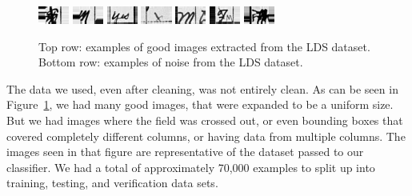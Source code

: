 \begin{figure}[ht]
\begin{center}
    \\[1em]
      \includegraphics[width=0.09\textwidth]{images/Subimages/problematic/004531795_00275-72.png}
      \includegraphics[width=0.09\textwidth]{images/Subimages/problematic/004531795_00275-86.png}
      \includegraphics[width=0.09\textwidth]{images/Subimages/problematic/004531795_00276-2.png}
      \includegraphics[width=0.09\textwidth]{images/Subimages/problematic/004531795_00276-49.png}
      \includegraphics[width=0.09\textwidth]{images/Subimages/problematic/004531795_00605-8.png}
      \includegraphics[width=0.09\textwidth]{images/Subimages/problematic/004531795_00778-55.png}
      \includegraphics[width=0.09\textwidth]{images/Subimages/problematic/004531871_00823-56.png}
  \end{center}
  \caption{
    Top row: examples of good images extracted from the LDS dataset.
    Bottom row: examples of noise from the LDS dataset.
    }
  \label{fig:goodAndBad}
\end{figure}

The data we used, even after cleaning, was not entirely clean.  As can be seen in Figure~\ref{fig:goodAndBad}, we had many good images, that were expanded to be a uniform size.  But we had images where the field was crossed out, or even bounding boxes that covered completely different columns, or having data from multiple columns.  The images seen in that figure are representative of the dataset passed to our classifier.  We had a total of approximately 70,000 examples to split up into training, testing, and verification data sets.

